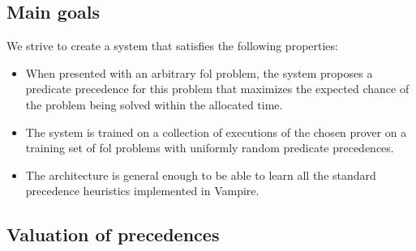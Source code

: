 





\newpage

\subsection{Main goals}

We strive to create a system that satisfies the following properties:

\begin{itemize}
	\item When presented with an arbitrary \gls{fol} problem,
	the system proposes a predicate precedence for this problem
	that maximizes the expected chance of the problem being solved
	within the allocated time.
	
	
	\item The system is trained on a collection of executions of the chosen prover
	on a training set of \gls{fol} problems
	with uniformly random predicate precedences.
	
	\item The architecture is general enough to be able to learn
	all the standard precedence heuristics implemented in Vampire.\cite{?}
\end{itemize}


\subsection{Valuation of precedences}
\label{sec:precedence-valuation}

